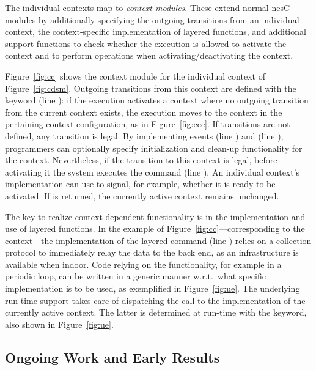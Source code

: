 

The individual contexts map to \emph{context modules}. These extend
normal nesC modules by additionally specifying the outgoing
transitions from an individual context, the context-specific
implementation of layered functions, and additional support functions
to check whether the execution is allowed to activate the context and
to perform operations when activating/deactivating the context.

Figure~\ref{fig:cc} shows the context module for the individual
{} context of Figure~\ref{fig:cdsm}. Outgoing
transitions from this context are defined with the
{} keyword (line ): if the
execution activates a context where no outgoing transition from the
current context exists, the execution moves to the {}
context in the pertaining context configuration, as in
Figure~\ref{fig:ccc}. If transitions are not defined, any transition
is legal. By implementing events {} (line
) and {} (line
), programmers can optionally specify
initialization and clean-up functionality for the
context. Nevertheless, if the transition to this context is legal,
before activating it the system executes the {} command
(line ). An individual context's implementation can use
{} to signal, for example, whether it is ready to be
activated. If {} is returned, the currently active
context remains unchanged.

The key to realize context-dependent functionality is in the
implementation and use of layered functions. In the example of
Figure~\ref{fig:cc}---corresponding to the {}
context---the implementation of the layered command {}
(line ) relies on a collection protocol to
immediately relay the data to the back end, as an infrastructure is
available when indoor. Code relying on the {}
functionality, for example in a periodic loop, can be written in a
generic manner w.r.t.\ what specific implementation is to be used, as
exemplified in Figure~\ref{fig:ue}. The underlying run-time support
takes care of dispatching the call to the implementation of the
currently active context. The latter is determined at run-time with
the {} keyword, also shown in Figure~\ref{fig:ue}.

\subsection{Ongoing Work and Early Results}

